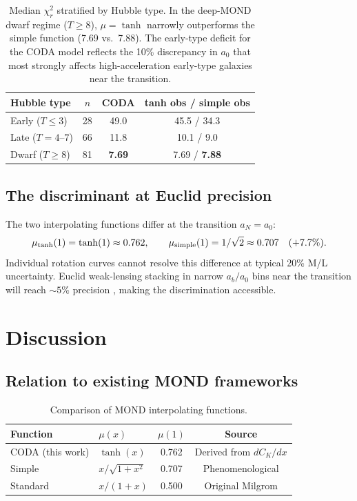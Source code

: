 \documentclass[a4paper,11pt]{article}
\newcommand{\az}{a_0}                                %
\newcommand{\aN}{a_N}                                %
\newcommand{\ab}{a_b}                                %
\begin{document}
\begin{table}[h]
\centering
\renewcommand{\arraystretch}{1.3}
\begin{tabular}{lccc}
  \toprule
  Hubble type & $n$ & CODA & tanh obs / simple obs \\
  \midrule
  Early ($T\leq3$) & 28 & 49.0 & 45.5 / 34.3 \\
  Late ($T=4$--$7$) & 66 & 11.8 & 10.1 / 9.0 \\
  Dwarf ($T\geq8$) & 81 & \textbf{7.69} & 7.69 / \textbf{7.88} \\
  \bottomrule
\end{tabular}
\caption{Median $\chi^2_r$ stratified by Hubble type.  In the deep-MOND
  dwarf regime ($T\geq8$), $\mu=\tanh$ narrowly outperforms the simple
  function (7.69 vs.\ 7.88).  The early-type deficit for the CODA model
  reflects the 10\% discrepancy in $\az$ that most strongly affects
  high-acceleration early-type galaxies near the transition.}
\label{tab:hubble}
\end{table}

\subsection{The discriminant at Euclid precision}

The two interpolating functions differ at the transition $\aN=\az$:
\begin{equation}
  \mu_{\tanh}(1) = \tanh(1) \approx 0.762, \qquad
  \mu_{\rm simple}(1) = 1/\sqrt{2} \approx 0.707 \quad (+7.7\%).
  \label{eq:mu_transition}
\end{equation}
Individual rotation curves cannot resolve this difference at typical 20\%
M/L uncertainty.  Euclid weak-lensing stacking in narrow $\ab/\az$ bins
near the transition will reach $\sim5\%$ precision \cite{Amendola:2018,
Desmond:2020}, making the discrimination accessible.

\section{Discussion}
\label{sec:discussion}

\subsection{Relation to existing MOND frameworks}

\begin{table}[h]
\centering
\renewcommand{\arraystretch}{1.3}
\begin{tabular}{llcc}
  \toprule
  Function & $\mu(x)$ & $\mu(1)$ & Source \\
  \midrule
  CODA (this work) & $\tanh(x)$ & 0.762 &
    Derived from $dC_K/dx$ \\
  Simple & $x/\sqrt{1+x^2}$ & 0.707 &
    Phenomenological \cite{Zhao:2006} \\
  Standard & $x/(1+x)$ & 0.500 &
    Original Milgrom \cite{Milgrom:1983a} \\
  \bottomrule
\end{tabular}
\caption{Comparison of MOND interpolating functions.}
\label{tab:mu}
\end{table}
\end{document}
